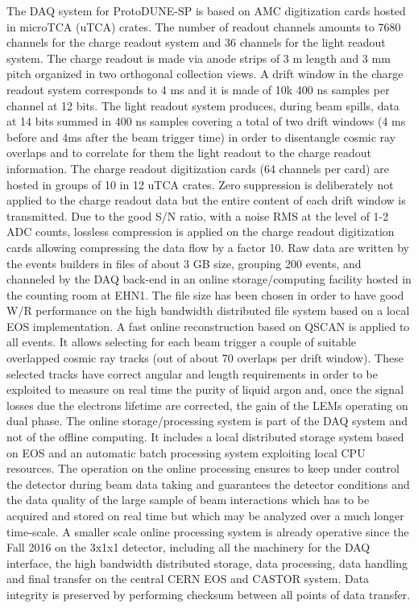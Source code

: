 \documentclass[12pt]{article}
\begin{document}
{The DAQ system for ProtoDUNE-SP is based on AMC digitization cards hosted in microTCA (uTCA) crates. 
The number of readout channels amounts to 7680 channels for the charge readout system and 36 channels for the light readout system.
The charge readout is made via anode strips of 3 m length and 3 mm pitch organized in two orthogonal collection views. 
A drift window in the charge readout system corresponds to 4 ms and it is made of 10k 400 ns samples per channel at 12 bits. 
The light readout system produces, during beam spills, data at 14 bits summed in 400 ns samples covering a total of two drift windows
 (4 ms before and 4ms after the beam trigger time) in order to disentangle cosmic ray overlaps and to correlate for them the light readout to the charge readout information.
 The charge readout digitization cards (64 channels per card) are hosted in groups of 10 in 12 uTCA crates.
Zero suppression is deliberately not applied to the charge readout data but the entire content of each drift window is transmitted.
 Due to the good S/N ratio, with a noise RMS at the level of 1-2 ADC counts, lossless compression is applied on the charge readout digitization cards 
allowing compressing the data flow by a factor 10.
Raw data are written by the events builders in files of about 3 GB size, grouping 200 events, and channeled by the DAQ back-end in an 
online storage/computing facility hosted in the counting room at EHN1. The file size has been chosen in order to have good W/R
 performance on the high bandwidth distributed file system based on a local EOS implementation. A fast online reconstruction based on QSCAN
 is applied to all events. It allows selecting for each beam trigger a couple of suitable overlapped cosmic ray tracks (out of about 70 overlaps per drift window). 
These selected tracks have correct angular and length requirements in order to be exploited to measure on real time the purity of liquid argon and, 
once the signal losses due the electrons lifetime are corrected, the gain of the LEMs operating on dual phase. 
The online storage/processing system is part of the DAQ system and not of the offline computing.
 It includes a local distributed storage system based on EOS and an automatic batch processing system exploiting local CPU resources.
 The operation on the online processing ensures to keep under control the detector during beam 
data taking and guarantees the detector conditions and the data quality of the large sample of beam interactions which has
 to be acquired and stored on real time but which may be analyzed over a much longer time-scale.
A smaller scale online processing system is already operative since the Fall 2016 on the 3x1x1 detector,
 including all the machinery for the DAQ interface, the high bandwidth distributed storage, data processing, 
data handling and final transfer on the central CERN EOS and CASTOR system. Data integrity  is preserved by performing
checksum between all points of data transfer. 

}
\end{document}
